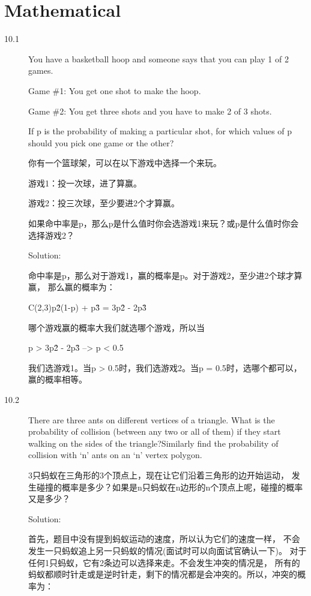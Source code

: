 \chapter{Mathematical}
\small{}

\begin{description}
\item[10.1] You have a basketball hoop and someone says that you can play 1 of 2 games.

Game \#1: You get one shot to make the hoop.

Game \#2: You get three shots and you have to make 2 of 3 shots.

If p is the probability of making a particular shot, for which values of p should you pick one game or the other?

你有一个篮球架，可以在以下游戏中选择一个来玩。

游戏1：投一次球，进了算赢。

游戏2：投三次球，至少要进2个才算赢。

如果命中率是p，那么p是什么值时你会选游戏1来玩？或p是什么值时你会选择游戏2？

Solution: 

命中率是p，那么对于游戏1，赢的概率是p。对于游戏2，至少进2个球才算赢， 那么赢的概率为：

C(2,3)p\^2(1-p) + p\^3 = 3p\^2 - 2p\^3

哪个游戏赢的概率大我们就选哪个游戏，所以当

p > 3p\^2 - 2p\^3  -->  p < 0.5

我们选游戏1。当p > 0.5时，我们选游戏2。当p = 0.5时，选哪个都可以，赢的概率相等。


\item[10.2] There are three ants on different vertices of a triangle. What is the probability of collision (between any two or all of them) if they start walking on the sides of the triangle?Similarly find the probability of collision with ‘n’ ants on an ‘n’ vertex polygon.

3只蚂蚁在三角形的3个顶点上，现在让它们沿着三角形的边开始运动， 发生碰撞的概率是多少？如果是n只蚂蚁在n边形的n个顶点上呢，碰撞的概率又是多少？

Solution: 

首先，题目中没有提到蚂蚁运动的速度，所以认为它们的速度一样， 不会发生一只蚂蚁追上另一只蚂蚁的情况(面试时可以向面试官确认一下)。 对于任何1只蚂蚁，它有2条边可以选择来走。不会发生冲突的情况是， 所有的蚂蚁都顺时针走或是逆时针走，剩下的情况都是会冲突的。所以，冲突的概率为：


\end{description}
